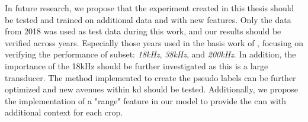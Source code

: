     
     In future research, we propose that the experiment created in this thesis should be tested and trained on additional data and with new features. Only the data from 2018 was used as test data during this work, and our results should be verified across years. Especially those years used in the basis work of \citeauthor{brautaset2020acoustic}, focusing on verifying the performance of subset: \textit{18kHz}, \textit{38kHz}, and \textit{200kHz}. In addition, the importance of the 18kHz should be further investigated as this is a large transducer. The method implemented to create the pseudo labels can be further optimized and new avenues within \gls{kd} should be tested. Additionally, we propose the implementation of a "range" feature in our model to provide the \gls{cnn} with additional context for each crop.
    
    
    
 